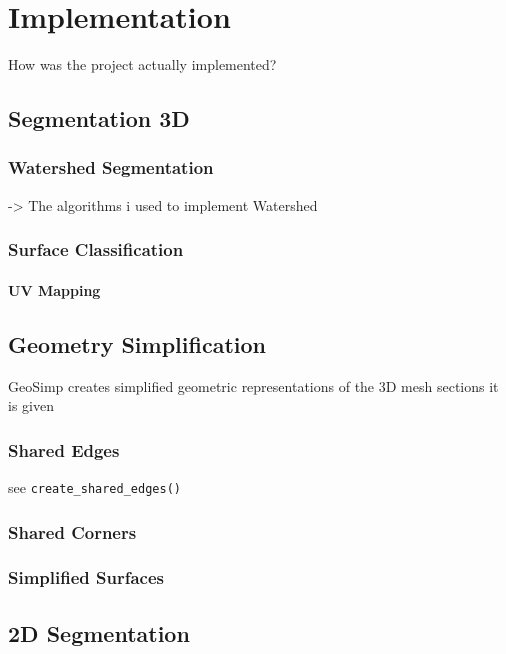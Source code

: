 \chapter{Implementation}\label{implementation}
How was the project actually implemented?

\section{Segmentation 3D}

\subsection{Watershed Segmentation}
-> The algorithms i used to implement Watershed

\subsection{Surface Classification}

\subsubsection{UV Mapping}

\section{Geometry Simplification}
GeoSimp creates simplified geometric representations of the 3D mesh sections it is given

\subsection{Shared Edges}
see \verb|create_shared_edges()|

\subsection{Shared Corners}

\subsection{Simplified Surfaces}

\section{2D Segmentation}


